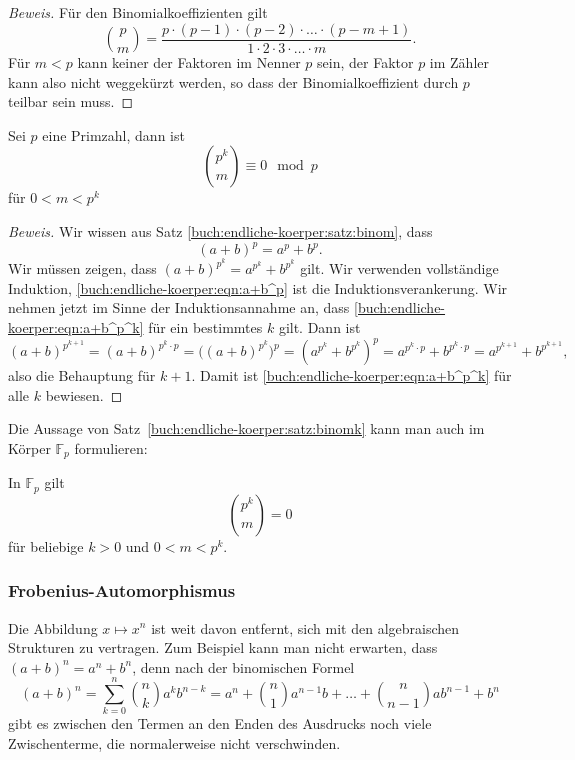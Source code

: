 \begin{proof}[Beweis]
Für den Binomialkoeffizienten gilt
\[
\binom{p}{m}
=
\frac{p\cdot (p-1)\cdot(p-2)\cdot\ldots\cdot (p-m+1)}{1\cdot 2\cdot 3\cdot\ldots\cdot m}.
\]
Für $m<p$ kann keiner der Faktoren im Nenner $p$ sein, der Faktor $p$
im Zähler kann also nicht weggekürzt werden, so dass der Binomialkoeffizient
durch $p$ teilbar sein muss.
\end{proof}

\begin{satz}
\label{buch:endliche-koerper:satz:binomk}
Sei $p$ eine Primzahl, dann ist
\begin{equation}
\binom{p^k}{m} \equiv 0\mod p
\label{buch:endliche-koerper:eqn:a+b^p^k}
\end{equation}
für $0<m<p^k$
\end{satz}

\begin{proof}[Beweis]
Wir wissen aus Satz \ref{buch:endliche-koerper:satz:binom}, dass 
\begin{equation}
(a+b)^p = a^p+b^p.
\label{buch:endliche-koerper:eqn:a+b^p}
\end{equation}
Wir müssen zeigen, dass $(a+b)^{p^k}=a^{p^k}+b^{p^k}$ gilt.
Wir verwenden vollständige Induktion, 
\eqref{buch:endliche-koerper:eqn:a+b^p} ist die Induktionsverankerung.
Wir nehmen jetzt im Sinne der Induktionsannahme an, dass
\eqref{buch:endliche-koerper:eqn:a+b^p^k} für ein bestimmtes $k$ gilt.
Dann ist
\[
(a+b)^{p^{k+1}}
=
(a+b)^{p^k\cdot p}
=
\bigl((a+b)^{p^k}\bigr)^p
=
(a^{p^k}+b^{p^k})^p
=
a^{p^k\cdot p}+b^{p^k\cdot p}
=
a^{p^{k+1}}
+
b^{p^{k+1}},
\]
also die Behauptung für $k+1$.
Damit ist
\eqref{buch:endliche-koerper:eqn:a+b^p^k} für alle $k$ bewiesen.
\end{proof}

Die Aussage von Satz~\ref{buch:endliche-koerper:satz:binomk} kann man 
auch im Körper $\mathbb{F}_p$ formulieren:

\begin{satz}
\label{buch:endliche-koerper:satz:binomFp}
In $\mathbb{F}_p$ gilt
\[
\binom{p^k}{m}=0
\]
für beliebige $k>0$ und $0<m<p^k$.
\end{satz}

\subsubsection{Frobenius-Automorphismus}
Die Abbildung $x\mapsto x^n$ ist weit davon entfernt, sich mit den
algebraischen Strukturen zu vertragen.
Zum Beispiel kann man nicht erwarten, dass $(a+b)^n = a^n + b^n$,
denn nach der binomischen Formel
\begin{equation}
(a+b)^n
=
\sum_{k=0}^n \binom{n}{k} a^k b^{n-k}
=
a^n + \binom{n}{1}a^{n-1}b + \dots + \binom{n}{n-1}ab^{n-1} + b^n
\label{buch:endliche-koerper:fig:binomischeformel}
\end{equation}
gibt es zwischen den Termen an den Enden des Ausdrucks noch viele
Zwischenterme, die normalerweise nicht verschwinden.

